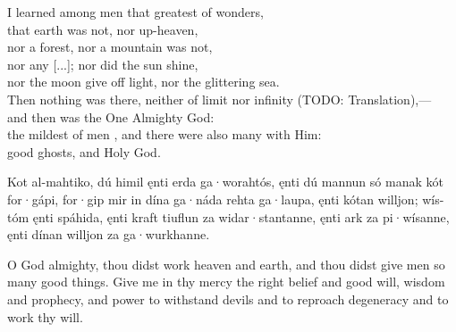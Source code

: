 \bvb I learned among men that greatest of wonders, \\
that earth was not, nor up-heaven, \\
nor a forest, nor a mountain was not, \\
nor any [...]; nor did the sun shine, \\
nor the moon give off light, nor the glittering sea. \\
Then nothing was there, neither of limit nor infinity (TODO: Translation),— \\
and then was the One Almighty God: \\
the mildest of men , and there were also many with Him: \\
good ghosts, and Holy God.\evb
\evg


\bpg
\bpa Kot al-mahtiko, dú himil ęnti erda ga·worahtós, ęnti dú mannun só manak kót for·gápi,
for·gip mir in dína ga·náda rehta ga·laupa, ęnti kótan willjon; wís-tóm ęnti spáhida, ęnti kraft tiuflun za widar·stantanne, ęnti ark za pi·wísanne, ęnti dínan willjon za ga·wurkhanne.\epa

\bpb O God almighty, thou didst work heaven and earth, and thou didst give men so many good things.
Give me in thy mercy the right belief and good will, wisdom and prophecy, and power to withstand devils and to reproach degeneracy and to work thy will.\epb
\epg

\sectionline
